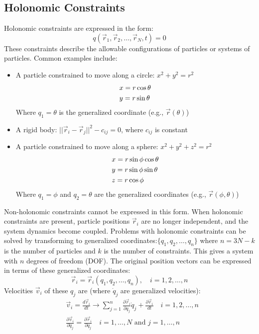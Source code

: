 \documentclass[conference]{IEEEtran}
\begin{document}
\subsection{Holonomic Constraints}
Holonomic constraints are expressed in the form:
\begin{equation}
    q(\vec{r}_1, \vec{r}_2, \ldots, \vec{r}_N, t) = 0
\end{equation}
These constraints describe the allowable configurations of particles or systems of particles. Common examples include:
\begin{itemize}
    \item A particle constrained to move along a circle: $x^2 + y^2 = r^2$ \begin{align}
        & x = r\cos\theta \notag \\
        & y = r\sin\theta 
    \end{align}
    Where $q_1 = \theta$ is the generalized coordinate (e.g., $\vec{r}(\theta)$)
    \item A rigid body: $||\vec{r}_i - \vec{r}_j||^2 - c_{ij} = 0$, where $c_{ij}$ is constant 
    \item A particle constrained to move along a sphere: $x^2 + y^2 + z^2 = r^2$ \begin{align}
        & x = r\sin\phi\cos\theta \notag \\
        & y = r\sin\phi\sin\theta \notag \\
        & z = r\cos\phi
    \end{align}
    Where $q_1 = \phi$ and $q_2 = \theta$ are the generalized coordinates (e.g., $\vec{r}(\phi, \theta)$)
\end{itemize}
Non-holonomic constraints cannot be expressed in this form. When holonomic constraints are present, particle positions $\vec{r}_i$ are no longer independent, and the system dynamics become coupled. Problems with holonomic constraints can be solved by transforming to generalized coordinates:$\{q_1, q_2, \ldots, q_{n}\}$ where $n = 3N - k$ is the number of particles and $k$ is the number of constraints. This gives a system with $n$ degrees of freedom (DOF). The original position vectors can be expressed in terms of these generalized coordinates:
\begin{equation}
    \vec{r}_i = \vec{r}_i(q_1, q_2, \ldots, q_{n}), \quad i = 1,2,\ldots,n
\end{equation}
Velocities $\vec{v}_i$ of these $q_j$ are (where $\dot{q}_j$ are generalized velocities):
\begin{align}
    & \vec{v}_i = \frac{d\vec{r}_i}{dt} \to \sum_{j=1}^n\frac{\partial \vec{r}_i}{\partial q_j}\dot{q}_j + \frac{\partial \vec{r}_i}{dt} \quad i = 1,2,\ldots,n \\
    & \frac{\partial \vec{v}_i}{\partial \dot{q}_j} = \frac{\partial \vec{r}_i}{\partial q_j} \quad i = 1,\ldots, N \text{ and } j = 1, \ldots, n
\end{align}
\end{document}
